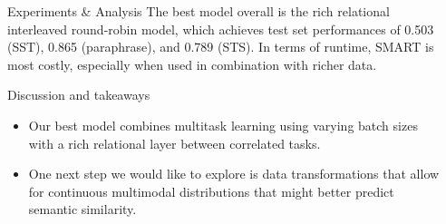\documentclass[final]{beamer}
\newlength{\sepwidth}
\newlength{\colwidth}
\newcommand{\separatorcolumn}{\begin{column}{\sepwidth}\end{column}}
\begin{document}
\begin{frame}[t]
\begin{columns}[t]
\begin{column}{\colwidth}
\begin{block}{Experiments \& Analysis}
The best model overall is the rich relational interleaved round-robin model, which achieves test set performances of 0.503 (SST), 0.865 (paraphrase), and 0.789 (STS).  In terms of runtime, SMART is most costly, especially when used in combination with richer data.
\vspace{-0.4cm}

\end{block}
    \begin{alertblock}{\small Discussion and takeaways}

    \begin{itemize}
    \item Our best model combines multitask learning using varying batch sizes with a rich relational layer between correlated tasks. 
    \item One next step we would like to explore is data transformations that allow for continuous multimodal distributions that might better predict semantic similarity.
    
    \end{itemize}
  \end{alertblock}

\end{column}

\separatorcolumn
\end{columns}
\vfill
\begin{block}

    \footnotesize{}

\end{block}

\end{frame}
\end{document}
